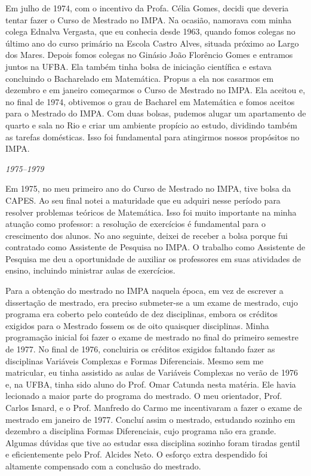 \documentclass{hipatia}
\begin{document}
Em julho de 1974, com o incentivo da Profa. Célia Gomes,
decidi que deveria tentar fazer o Curso de Mestrado no IMPA.
Na ocasião, namorava com minha colega Ednalva Vergasta, que
eu conhecia desde 1963, quando fomos colegas no último ano
do curso primário na Escola Castro Alves, situada próximo ao
Largo dos Mares. Depois fomos colegas no Ginásio João
Florêncio Gomes e entramos juntos na UFBA. Ela também tinha
bolsa de iniciação científica e estava concluindo o
Bacharelado em Matemática. Propus a ela nos casarmos em
dezembro e em janeiro começarmos o Curso de Mestrado no
IMPA. Ela aceitou e, no final de 1974, obtivemos o grau de
Bacharel em Matemática e fomos aceitos para o Mestrado do
IMPA. Com duas bolsas, pudemos alugar um apartamento de
quarto e sala no Rio e criar um ambiente propício ao estudo,
dividindo também as tarefas domésticas. Isso foi fundamental
para atingirmos nossos propósitos no IMPA.



\begin{center}\emph{1975--1979}\end{center}



Em 1975, no meu primeiro ano do Curso de Mestrado no IMPA,
tive bolsa da CAPES. Ao seu final notei a maturidade que eu
adquiri nesse período para resolver problemas teóricos de
Matemática. %
Isso foi muito importante na minha atuação como %
professor: a resolução de exercícios é fundamental para o
crescimento dos alunos. No ano seguinte, deixei de receber a
bolsa porque fui contratado como Assistente de Pesquisa no
IMPA. O trabalho como Assistente de Pesquisa me deu a
oportunidade de auxiliar os professores em suas atividades
de ensino, incluindo ministrar aulas de exercícios.

Para a obtenção do mestrado no IMPA naquela época, em vez de
escrever a dissertação de mestrado, era preciso submeter-se
a um exame de mestrado, cujo programa era coberto pelo
conteúdo de dez disciplinas, embora os créditos exigidos
para o Mestrado fossem os de oito quaisquer disciplinas.
Minha programação inicial foi fazer o exame de mestrado no
final do primeiro semestre de 1977. No final de 1976,
concluiria os créditos exigidos faltando fazer as
disciplinas Variáveis Complexas e Formas Diferenciais. Mesmo
sem me matricular, eu tinha assistido as aulas de Variáveis
Complexas no verão de 1976 e, na UFBA, tinha sido aluno do
Prof. Omar Catunda nesta matéria. Ele havia lecionado a
maior parte do programa do mestrado. O meu orientador, Prof.
Carlos Isnard, e o Prof. Manfredo do Carmo me incentivaram a
fazer o exame de mestrado em janeiro de 1977. %
Concluí
assim o mestrado, estudando sozinho em dezembro a disciplina
Formas Diferenciais, cujo programa não era grande. Algumas
dúvidas que tive ao estudar essa disciplina sozinho foram
tiradas gentil e eficientemente pelo Prof. Alcides Neto. O
esforço extra despendido foi altamente compensado com a
conclusão do mestrado.
\end{document}
